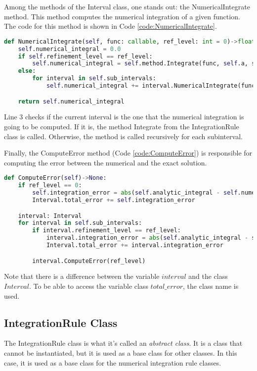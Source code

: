 Among the methods of the Interval class, one stands out: the NumericalIntegrate method. This method computes the numerical integration of a given function. The code for this method is shown in Code \ref{code:NumericalIntegrate}. 
\begin{lstlisting}[language=python, caption={NumericalIntegrate Method.}, label={code:NumericalIntegrate}]
def NumericalIntegrate(self, func: callable, ref_level: int = 0)->float:
    self.numerical_integral = 0.0
    if self.refinement_level == ref_level:
        self.numerical_integral = self.method.Integrate(func, self.a, self.b, self.n_points)
    else:
        for interval in self.sub_intervals:
            self.numerical_integral += interval.NumericalIntegrate(func, ref_level)

    return self.numerical_integral
\end{lstlisting}

Line 3 checks if the current interval is the one that the numerical integration is going to be computed. If it is, the method Integrate from the IntegrationRule class is called. Otherwise, the method is called recursively for each subinterval.

Finally, the ComputeError method (Code \ref{code:ComputeError}) is responsible for computing the error between the numerical and the exact solution.
\begin{lstlisting}[language=python, caption={ComputeError Method}, label={code:ComputeError}]
def ComputeError(self)->None:
    if ref_level == 0:
        self.integration_error = abs(self.analytic_integral - self.numerical_integral)
        Interval.total_error += self.integration_error

    interval: Interval
    for interval in self.sub_intervals:
        if interval.refinement_level == ref_level: 
            interval.integration_error = abs(self.analytic_integral - self.numerical_integral)
            Interval.total_error += interval.integration_error

        interval.ComputeError(ref_level)
\end{lstlisting}

Note that there is a difference between the variable $interval$ and the class $Interval$. To be able to access the variable class $total\_error$, the class name is used.

\subsection{IntegrationRule Class}
The IntegrationRule class is what it's called an \textit{abstract class}. It is a class that cannot be instantiated, but it is used as a base class for other classes. In this case, it is used as a base class for the numerical integration rule classes. 

